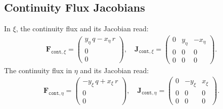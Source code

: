 {{\subsection{Continuity Flux Jacobians}
In $\xi$, the continuity flux and its Jacobian read:
%
\begin{align}
	\mathbf{F}_{\texttt{cont},\xi}=
	\begin{pmatrix}
		y_{\eta}\, q - x_{\eta}\, r\\
		0\\
		0
	\end{pmatrix}, \quad
	\mathbf{J}_{\texttt{cont},\xi}=
	\begin{pmatrix}
		0 & y_{\eta} & -x_{\eta}\\
		0
		& 0
		& 0\\
		0
		& 0
		& 0
	\end{pmatrix}.
\end{align}
%
The continuity flux in $\eta$ and its Jacobian read:
%
\begin{align}
	\mathbf{F}_{\texttt{cont},\eta}=
	\begin{pmatrix}
		-y_{\xi}\, q + x_{\xi}\, r\\
		0 \\
		0
	\end{pmatrix}, \quad
	\mathbf{J}_{\texttt{cont},\eta}=
	\begin{pmatrix}
		0 & -y_{\xi} &  x_{\xi}\\
		0
		& 0
		& 0\\
		0
		& 0
		& 0
	\end{pmatrix}.
\end{align}
}}
